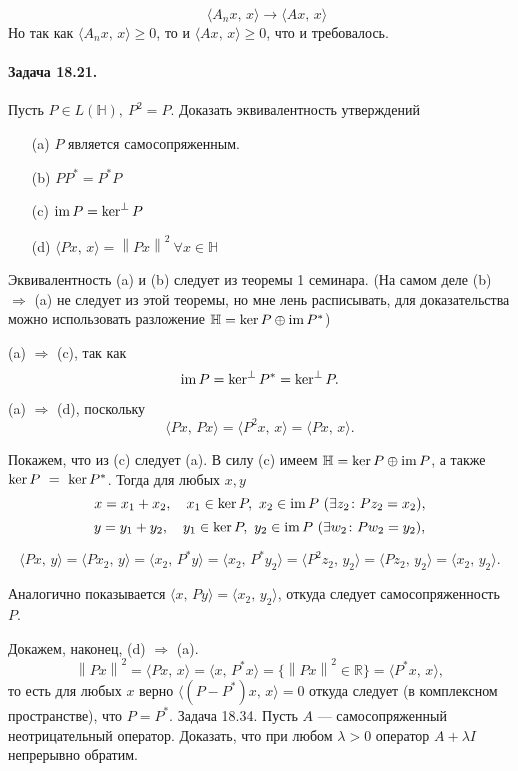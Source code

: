 \documentclass[16pt]{article}
\newenvironment{Sol}{\par\noindent{\it Решение:}}
\DeclareMathOperator{\Ker}{ker}
\DeclareMathOperator{\Ima}{im}
\newcommand\Real{\mathbb{R}}
\newcommand\Scal[2]{\langle #1,\, #2 \rangle}
\newcommand\Norm[1]{\left\| #1 \right\|}
\begin{document}
\begin{Sol}
$$\quad \Scal{A_nx}{x} \to \Scal{Ax}{x}$$
Но так как $\Scal{A_nx}{x} \geqslant 0$, то и $\Scal{Ax}{x} \geqslant 0$, что и требовалось.
\end{Sol}
\newpage
\paragraph{Задача 18.21.} Пусть $P\in L(\mathbb{H}), \ P^2 = P$. Доказать эквивалентность утверждений
\begin{itemize}
\item[(a)] $P$ является самосопряженным.
\item[(b)] $PP^* = P^*P$
\item[(c)] $\Ima P = \Ker^\bot P$
\item[(d)] $\Scal{Px}{x} = \Norm{Px}^2 \ \forall x \in \mathbb{H}$
\end{itemize}

\begin{Sol}
Эквивалентность (a) и (b) следует из теоремы 1 семинара. (На самом деле (b) $\Rightarrow$ (a) не следует из этой
теоремы, но мне лень расписывать, для доказательства можно использовать разложение $\mathbb{H} =\Ker P \oplus
\Ima P^*$)

(a) $\Rightarrow$ (c), так как
$$\Ima P = \Ker^\bot P^* = \Ker^\bot P.$$

(a) $\Rightarrow$ (d), поскольку
$$\Scal{Px}{Px} = \Scal{P^2x}{x} = \Scal{Px}{x}.$$

Покажем, что из (c) следует (a). В силу (c) имеем $\mathbb{H} = \Ker P \oplus \Ima P$, а также
 $\Ker P~=~\Ker P^*$. Тогда для любых $x, y$
 $$x = x_1 + x_2, \quad x_1 \in \Ker P, \ x_2 \in \Ima P \ (\exists z_2\colon Pz_2 = x_2),$$
 $$y = y_1 + y_2, \quad y_1 \in \Ker P, \ y_2 \in \Ima P \ (\exists w_2\colon Pw_2 = y_2),$$
 
$$\Scal{Px}{y} = \Scal{Px_2}{y} = \Scal{x_2}{P^*y} = \Scal{x_2}{P^*y_2} = \Scal{P^2z_2}{y_2} = \Scal{Pz_2}{y_2} = 
\Scal{x_2}{y_2}.$$

Аналогично показывается $\Scal{x}{Py} = \Scal{x_2}{y_2}$, откуда следует самосопряженность $P$.

Докажем, наконец, (d) $\Rightarrow$ (a). 
$$\Norm{Px}^2 = \Scal{Px}{x} = \Scal{x}{P^*x} = \{\Norm{Px}^2 \in \Real\} = \Scal{P^*x}{x},$$
то есть для любых $x$ верно $\Scal{(P-P^*)x}{x} = 0$ откуда следует (в комплексном пространстве), что $P = P^*$.
\end{Sol}

\paragraph{Задача 18.34.} Пусть $A$ --- самосопряженный неотрицательный оператор. Доказать, что при любом
$\lambda > 0$ оператор $A + \lambda I$ непрерывно обратим.
\end{document}
